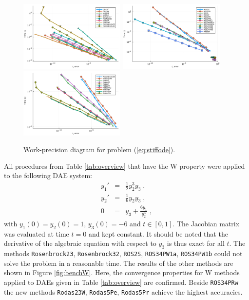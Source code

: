 \documentclass{juliacon}
\begin{document}
\begin{figure}
 \centering
 \includegraphics[width=0.47\textwidth]{Abb3a.pdf}
 \includegraphics[width=0.47\textwidth]{Abb3b.pdf}
 \includegraphics[width=0.47\textwidth]{Abb3c.pdf}
 \caption{Work-precision diagram for problem (\ref{eq:stiffode}).}\label{fig:bench3a}
\end{figure}

All procedures from Table \ref{tab:overview} that have the W property were applied to the following DAE system:
\begin{eqnarray}
y_1' &=& \frac{1}{2}y_2^3 y_3 \; , \label{eq:w1} \\
y_2' &=& \frac{1}{6} y_2 y_3 \; , \label{eq:w2}\\
0 &=& y_3 + \frac{6 y_1}{y_2^3} \; ,\label{eq:w3}
\end{eqnarray}
with $y_1(0) = y_2(0) =1$, $y_3(0)=-6$ and $t \in [0,1]$.
The Jacobian matrix was evaluated at time $t=0$ and kept constant. It should be noted that the derivative of the algebraic equation with respect to 
$y_3$ is thus exact for all $t$.
The methods \verb|Rosenbrock23|, \verb|Rosenbrock32|, \verb|ROS2S|, \verb|ROS34PW1a|, \verb|ROS34PW1b| could not solve the problem in a reasonable time. 
The results of the other methods are shown in Figure \ref{fig:benchW}. Here, the convergence properties for W methods applied to DAEs given in 
Table \ref{tab:overview} are confirmed. Beside \verb|ROS34PRw| the new methods \verb|Rodas23W|, \verb|Rodas5Pe|, \verb|Rodas5Pr| achieve the highest accuracies.
\end{document}
